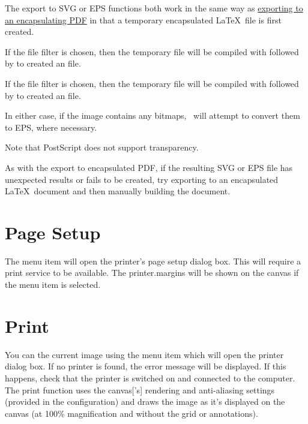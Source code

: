 The export to SVG or EPS functions both work in the same way
as \hyperref[sec:exportdoc]{exporting to an encapsulating PDF}
in that a temporary encapsulated \LaTeX\ file is first created.

If the  file filter is chosen, then the temporary
file will be compiled with  followed by
 to created an   file.

If the  file filter is chosen, then the temporary
file will be compiled with  followed by
 to created an  file.

In either case, if the image contains any
\glspl{bitmap}, \FlowframTk\ will attempt to convert
them to EPS, where necessary.

\begin{important}
Note that PostScript does not support transparency.
\end{important}

As with the export to encapsulated PDF, if the resulting SVG or EPS
file has unexpected results or fails to be created, try exporting to
an encapsulated \LaTeX\ document and then manually building the
document.

\section{Page Setup}\label{sec:pagesetup}


The  menu item will open the printer's page
setup dialog box. This will require a print service to be available.
The \glspl{printer.margin} will be shown on the \gls{canvas} if the
 menu item is selected.

\section{Print}\label{sec:print}


You can  the current image using the  menu
item which will open the printer dialog box. If no printer is found,
the error message  will
be displayed. If this happens, check that the printer is switched
on and connected to the computer. The print function uses the
\gls{canvas}['s] \gls{rendering} and \gls{anti-aliasing} settings
(provided in the  configuration) and draws
the image as it's displayed on the \gls{canvas} (at 100\%
magnification and without the grid or annotations).

